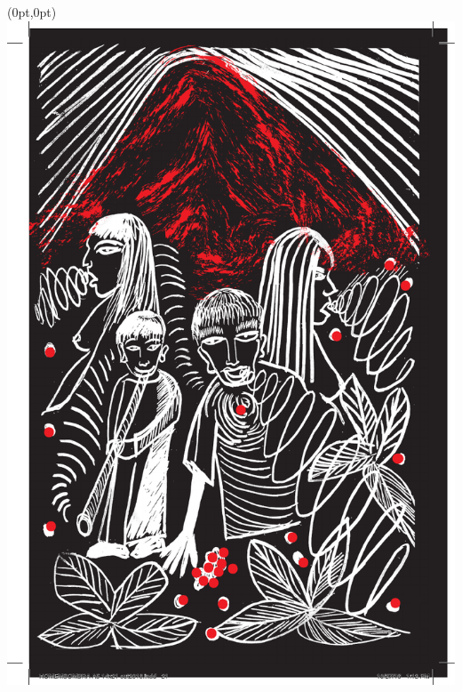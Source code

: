 \begin{textblock*}{8in}(0pt,0pt)%
\vspace*{-2.8cm}
\hspace*{-3.2cm}\includegraphics[width=153mm]{./imgs/img9.pdf}
\end{textblock*}

\endgroup
